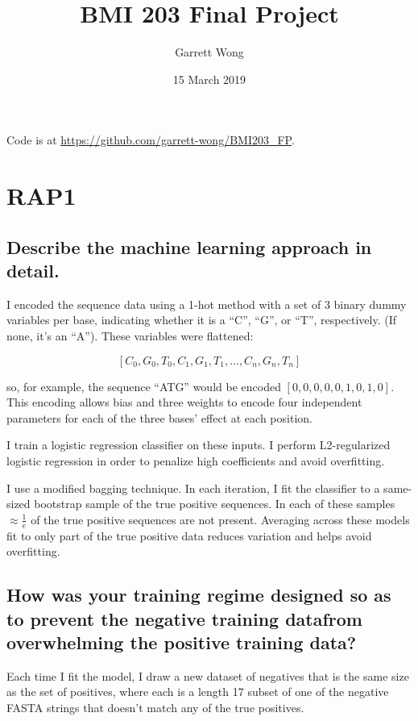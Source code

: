 \documentclass[]{article}
\begin{document}
\title{BMI 203 Final Project}
\author{Garrett Wong}
\date{15 March 2019}
\maketitle

Code is at \url{https://github.com/garrett-wong/BMI203_FP}.

\section[2]{RAP1}

\subsection{Describe the machine learning approach in detail.}

I encoded the sequence data using a 1-hot method with a set of 3 binary dummy variables per base, indicating whether it is a ``C'', ``G'', or ``T'', respectively. (If none, it's an ``A''). These variables were flattened:

\[ [C_0, G_0, T_0, C_1, G_1, T_1, \ldots, C_n, G_n, T_n] \]

so, for example, the sequence ``ATG'' would be encoded $[0, 0, 0, 0, 0, 1, 0, 1, 0]$. This encoding allows bias and three weights to encode four independent parameters for each of the three bases' effect at each position.

I train a logistic regression classifier on these inputs. I perform L2-regularized logistic regression in order to penalize high coefficients and avoid overfitting.

I use a modified bagging technique. In each iteration, I fit the classifier to a same-sized bootstrap sample of the true positive sequences. In each of these samples $\approx \frac{1}{e}$ of the true positive sequences are not present. Averaging across these models fit to only part of the true positive data reduces variation and helps avoid overfitting.

\subsection{How was your training regime designed so as to prevent the negative training datafrom overwhelming the positive training data?}

Each time I fit the model, I draw a new dataset of negatives that is the same size as the set of positives, where each is a length 17 subset of one of the negative FASTA strings that doesn't match any of the true positives.
\end{document}
